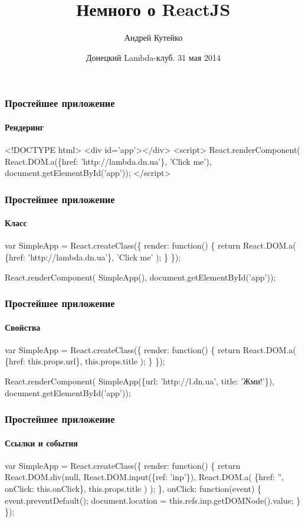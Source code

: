 \documentclass[10pt,utf8]{beamer}
\title{Немного о ReactJS}
\date{Донецкий Lambda-клуб. 31 мая 2014}
\author{Андрей Кутейко}
\begin{document}
\begin{frame}
  \titlepage
\end{frame}

\begin{frame}[fragile]
  \frametitle{Простейшее приложение}
  \framesubtitle{Рендеринг}

  \begin{semiverbatim}
    <!DOCTYPE html>
    <div id='app'></div>
    <script>
    React.renderComponent(
      React.DOM.a(\{href: 'http://lambda.dn.ua'\}, 'Click me'),
      document.getElementById('app'));
    </script>
  \end{semiverbatim}
\end{frame}

\begin{frame}[fragile]
  \frametitle{Простейшее приложение}
  \framesubtitle{Класс}

  \begin{semiverbatim}
    var SimpleApp = React.createClass(\{
      render: function() \{
        \alert{return React.DOM.a(
          \{href: 'http://lambda.dn.ua'\},
          'Click me'
        );}
      \}
    \});

    React.renderComponent(
      \alert{SimpleApp()},
      document.getElementById('app'));
  \end{semiverbatim}
\end{frame}

\begin{frame}[fragile]
  \frametitle{Простейшее приложение}
  \framesubtitle{Свойства}

  \begin{semiverbatim}
    var SimpleApp = React.createClass(\{
      render: function() \{
        return React.DOM.a(
          \{href: \alert{this.props.url}\},
          \alert{this.props.title}
        );
      \}
    \});

    React.renderComponent(
      SimpleApp(\alert{\{url: 'http://l.dn.ua', title: 'Жми!'\}}),
      document.getElementById('app'));
  \end{semiverbatim}
\end{frame}

\begin{frame}[fragile]
  \frametitle{Простейшее приложение}
  \framesubtitle{Ссылки и события}

  \begin{semiverbatim}
    var SimpleApp = React.createClass(\{
      render: function() \{
        return React.DOM.div(null,
          React.DOM.input(\{\alert{ref: 'inp'}\}),
          React.DOM.a(
            \{href: '', onClick: \alert{this.onClick}\},
            this.props.title
          )
        );
      \},
      onClick: function(event) \{
        event.preventDefault();
        document.location = \alert{this.refs.inp.getDOMNode()}.value;
      \}
    \});
  \end{semiverbatim}
\end{frame}
\end{document}
